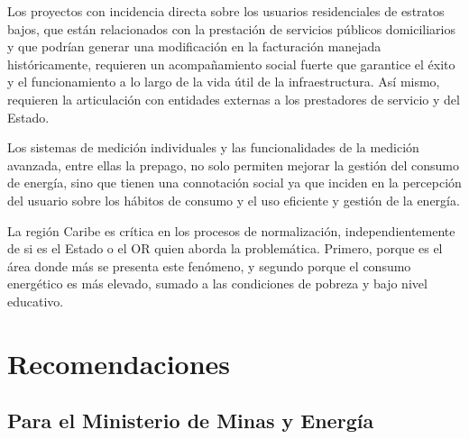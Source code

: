 Los proyectos con incidencia directa sobre los usuarios residenciales
de estratos bajos, que están relacionados con la prestación de servicios
públicos domiciliarios y que podrían generar una modificación en la
facturación manejada históricamente, requieren un acompañamiento social
fuerte que garantice el éxito y el funcionamiento a lo largo de la vida
útil de la infraestructura. Así mismo, requieren la articulación con
entidades externas a los prestadores de servicio y del Estado.

Los sistemas de medición individuales y las funcionalidades de la
medición avanzada, entre ellas la prepago, no solo permiten mejorar la
gestión del consumo de energía, sino que tienen una connotación social
ya que inciden en la percepción del usuario sobre los hábitos de consumo
y el uso eficiente y gestión de la energía.

La región Caribe es crítica en los procesos de normalización,
independientemente de si es el Estado o el OR quien aborda la
problemática. Primero, porque es el área donde más se presenta este
fenómeno, y segundo porque el consumo energético es más elevado, sumado
a las condiciones de pobreza y bajo nivel educativo.


\section{Recomendaciones}
\label{sec:recomendaciones}

\subsection{Para el Ministerio de Minas y Energía}
\label{subsec:rec_mme}

